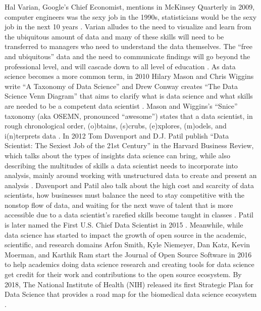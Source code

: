 \documentclass[010-intro.tex]{subfiles}
\begin{document}
    Hal Varian, Google's Chief Economist, mentions in McKinsey Quarterly in 2009,
    computer engineers was the sexy job in the 1990s,
    statisticians would be the sexy job in the next 10 years
    \cite{HalVarianHow2009}.
    Varian alludes to
    the need to visualize and learn from the ubiquitous amount of data and
    many of these skills will need to be transferred to managers who need to understand the data themselves.
    The ``free and ubiquitous'' data and the need to communicate findings will go beyond the professional level,
    and will cascade down to all level of education
    \cite{HalVarianHow2009}.
    As data science becomes a more common term,
    in 2010 Hilary Mason and Chris Wiggins write ``A Taxonomy of Data Science''
    \cite{masonTaxonomyDataScience2010}
    and
    Drew Conway creates ``The Data Science Venn Diagram''
    that aims to clarify what is data science and what skills are needed to be a competent data scientist
    \cite{conwayDataScienceVenn}.
    Mason and Wiggins's ``Snice'' taxonomy (aka OSEMN, pronounced ``awesome'') states that a data scientist,
    in rough chronological order,
    (o)btains, (s)crubs, (e)xplores, (m)odels, and i(n)terprets data
    \cite{masonTaxonomyDataScience2010}.
    In 2012 Tom Davenport and D.J. Patil publish
    ``Data Scientist: The Sexiest Job of the 21st Century''
    in the Harvard Business Review,
    which talks about the types of insights data science can bring,
    while also describing the multitudes of skills a data scientist needs to incorporate into analysis,
    mainly around working with unstructured data to create and present an analysis
    \cite{davenportDataScientistSexiest2012}.
    Davenport and Patil also talk about the high cost and scarcity of data scientists,
    how businesses must balance the need to stay competitive with the nonstop flow of data,
    and waiting for the next wave of talent that is more accessible
    due to a data scientist's rarefied skills become taught in classes
    \cite{davenportDataScientistSexiest2012}.
    Patil is later named the First U.S. Chief Data Scientist in 2015
    \cite{smithWhiteHouseNames2015}.
    Meanwhile, while data science has started to impact the growth of open source in the
    academic, scientific, and research domains
    \cite{tyagiHowFortune5002016, guszczaDataScienceOpen2015, kirschHowOpenSource2021}
    Arfon Smith, Kyle Niemeyer, Dan Katz, Kevin Moerman, and Karthik Ram start
    the Journal of Open Source Software in 2016 \cite{smithJournalOpenSource2018}
    to help academics doing data science research and creating tools for data science get
    credit for their work and contributions to the open source ecosystem.
    By 2018,
    The National Institute of Health (NIH) released its first Strategic Plan for Data Science
    that provides a road map for the biomedical data science ecosystem
    \cite{nationalinstitutesofhealthNIHStrategicPlan2020}.
    
\end{document}
